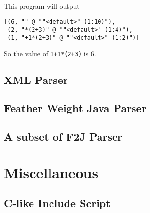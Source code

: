 This program will output

\begin{lstlisting}
[(6, "" @ ""<default>" (1:10)"),
 (2, "*(2+3)" @ ""<default>" (1:4)"),
 (1, "+1*(2+3)" @ ""<default>" (1:2)")]
\end{lstlisting}

So the value of \texttt{1+1*(2+3)} is 6.

\subsection{XML Parser}

\subsection{Feather Weight Java Parser}

\subsection{A subset of F2J Parser}

\section{Miscellaneous}
\subsection{C-like Include Script}

